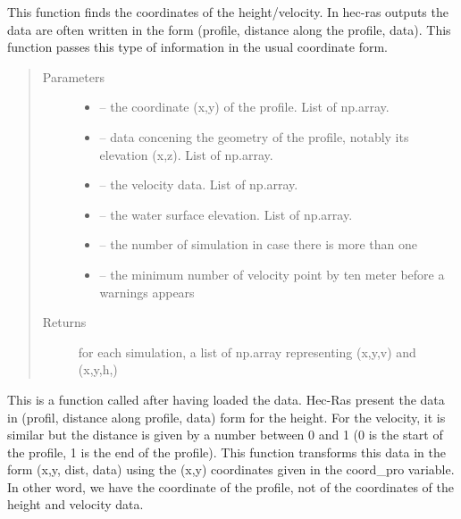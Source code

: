 \documentclass[letterpaper,10pt,english]{sphinxmanual}
\begin{document}
\begin{fulllineitems}
\label{\detokenize{index:src.Hec_ras06.find_coord_height_velocity}}
This function finds the coordinates of the height/velocity. In hec-ras outputs the data are often written in the
form (profile, distance along the profile, data). This function passes this type of information in the usual
coordinate form.
\begin{quote}\begin{description}
\item[{Parameters}] \leavevmode\begin{itemize}
\item {} 
 -- the coordinate (x,y) of the profile. List of np.array.

\item {} 
 -- data concening the geometry of the profile, notably its elevation (x,z). List of np.array.

\item {} 
 -- the velocity data. List of np.array.

\item {} 
 -- the water surface elevation. List of np.array.

\item {} 
 -- the number of simulation in case there is more than one

\item {} 
 -- the minimum number of velocity point by ten meter before a warnings appears

\end{itemize}

\item[{Returns}] \leavevmode
for each simulation, a list of np.array representing (x,y,v) and (x,y,h,)

\end{description}\end{quote}


This is a function called after having loaded the data. Hec-Ras present the data in (profil, distance along
profile, data) form for the height. For the velocity, it is similar but the distance is given by a number between
0 and 1 (0 is the start of the profile, 1 is the end of the profile). This function transforms this data in the form
(x,y, dist, data) using the (x,y) coordinates given in the coord\_pro variable. In other word,  we have the
coordinate of the profile, not of the coordinates of the height and velocity data.


\end{fulllineitems}
\end{document}

